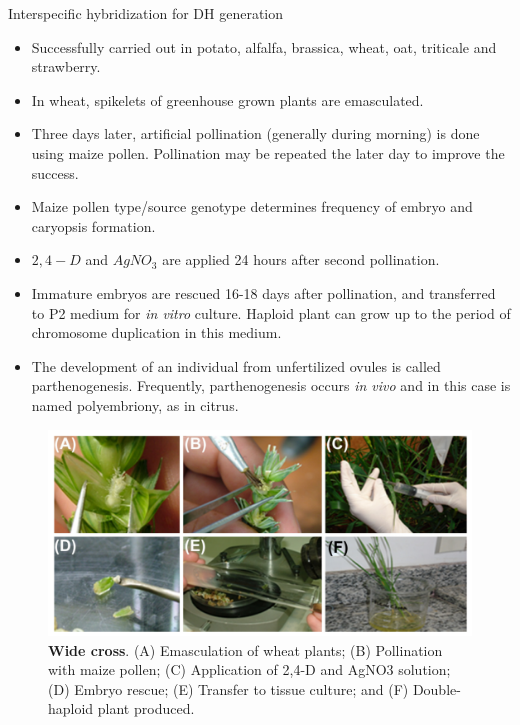 \documentclass[
  ignorenonframetext,
  aspectratio=169]{beamer}
\providecommand{\tightlist}{%
  \setlength{\itemsep}{0pt}\setlength{\parskip}{0pt}}
\begin{document}
\begin{frame}{Interspecific hybridization for DH generation}
\protect\hypertarget{interspecific-hybridization-for-dh-generation}{}
\begin{itemize}
\tightlist
\item
  Successfully carried out in potato, alfalfa, brassica, wheat, oat,
  triticale and strawberry.
\item
  In wheat, spikelets of greenhouse grown plants are emasculated.
\item
  Three days later, artificial pollination (generally during morning) is
  done using maize pollen. Pollination may be repeated the later day to
  improve the success.
\item
  Maize pollen type/source genotype determines frequency of embryo and
  caryopsis formation.
\item
  \(2,4-D\) and \(Ag NO_3\) are applied 24 hours after second
  pollination.
\item
  Immature embryos are rescued 16-18 days after pollination, and
  transferred to P2 medium for \emph{in vitro} culture. Haploid plant
  can grow up to the period of chromosome duplication in this medium.
\item
  The development of an individual from unfertilized ovules is called
  parthenogenesis. Frequently, parthenogenesis occurs \emph{in vivo} and
  in this case is named polyembriony, as in citrus.
\end{itemize}
\end{frame}

\begin{frame}{}
\protect\hypertarget{section-6}{}
\begin{figure}
\includegraphics[width=0.6\linewidth]{../images/wheat-embryo-rescue} \caption{\textbf{Wide cross}. (A) Emasculation of wheat plants; (B) Pollination with maize pollen; (C) Application of 2,4-D and AgNO3 solution; (D) Embryo rescue; (E) Transfer to tissue culture; and (F) Double-haploid plant produced.}\label{fig:wheat-embryo-rescue-wide-hybridization}
\end{figure}
\end{frame}
\end{document}
